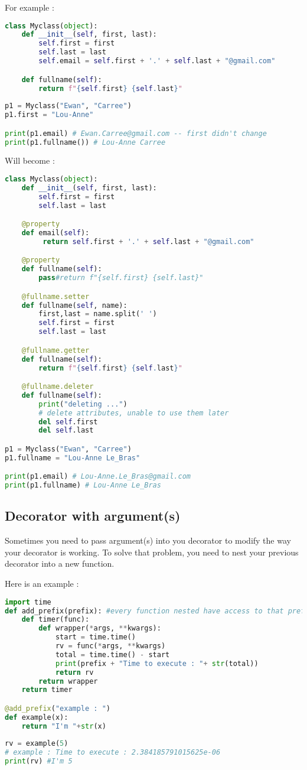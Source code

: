 \documentclass[a4paper, 12pt, titlepage]{scrartcl} %
\begin{document}
For example :
\begin{lstlisting}[language=Python]
class Myclass(object):
	def __init__(self, first, last):
		self.first = first
		self.last = last
		self.email = self.first + '.' + self.last + "@gmail.com"

	def fullname(self):
		return f"{self.first} {self.last}"
		
p1 = Myclass("Ewan", "Carree")
p1.first = "Lou-Anne"

print(p1.email) # Ewan.Carree@gmail.com -- first didn't change
print(p1.fullname()) # Lou-Anne Carree
\end{lstlisting} \vspace{5mm}
Will become :
\label{Del}
\begin{lstlisting}[language=Python]
class Myclass(object):
	def __init__(self, first, last):
		self.first = first
		self.last = last

	@property
	def email(self):
		 return self.first + '.' + self.last + "@gmail.com"

	@property
	def fullname(self):
		pass#return f"{self.first} {self.last}"

	@fullname.setter
	def fullname(self, name):
		first,last = name.split(' ')
		self.first = first
		self.last = last

	@fullname.getter
	def fullname(self):
		return f"{self.first} {self.last}"

	@fullname.deleter
	def fullname(self):
		print("deleting ...")
		# delete attributes, unable to use them later
		del self.first 
		del self.last

p1 = Myclass("Ewan", "Carree")
p1.fullname = "Lou-Anne Le_Bras"

print(p1.email) # Lou-Anne.Le_Bras@gmail.com
print(p1.fullname) # Lou-Anne Le_Bras
\end{lstlisting} \vspace{5mm}

\subsection{Decorator with argument(s)}
Sometimes you need to pass argument(s) into you decorator to modify the way your decorator is working. To solve that problem, you need to nest your previous decorator into a new function. 

\vspace{5mm}

Here is an example :

\begin{lstlisting}[language=Python]
import time
def add_prefix(prefix): #every function nested have access to that prefix : enclosing
    def timer(func):
    	def wrapper(*args, **kwargs):
    		start = time.time()
    		rv = func(*args, **kwargs)
    		total = time.time() - start
    		print(prefix + "Time to execute : "+ str(total))
    		return rv
    	return wrapper
    return timer

@add_prefix("example : ")
def example(x):
	return "I'm "+str(x)
	
rv = example(5)
# example : Time to execute : 2.384185791015625e-06
print(rv) #I'm 5
\end{lstlisting} \vspace{5mm}
\end{document}
